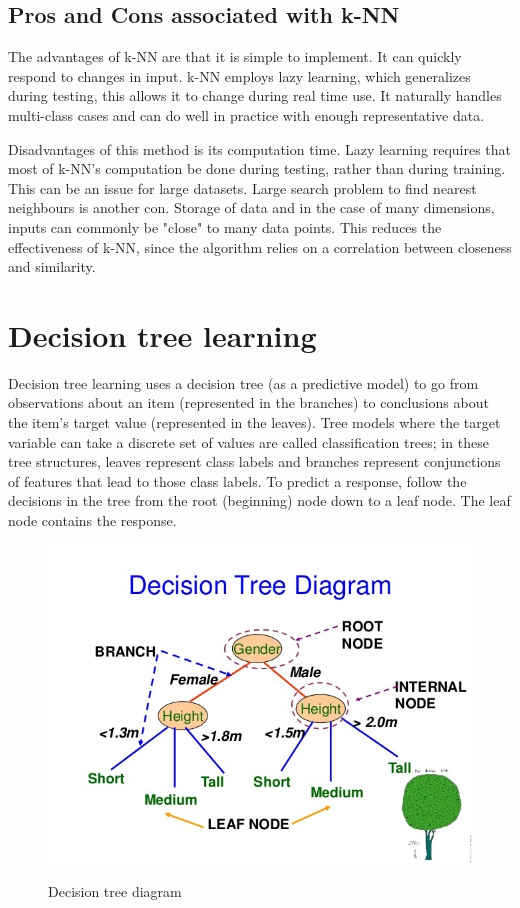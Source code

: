 \subsection{Pros and Cons associated with k-NN} \label{Pros and Cons associated with k-NN}
\noindent The advantages of k-NN are that it is simple to implement. It can quickly respond to changes in input. k-NN employs lazy learning, which generalizes during testing, this allows it to change during real time use. It naturally handles multi-class cases and can do well in practice with enough representative data. 

\noindent Disadvantages of this method is its computation time. Lazy learning requires that most of k-NN's computation be done during testing, rather than during training. This can be an issue for large datasets. Large search problem to find nearest neighbours is another con. Storage of data and in the case of many dimensions, inputs can commonly be "close" to many data points. This reduces the effectiveness of k-NN, since the algorithm relies on a correlation between closeness and similarity.

\newpage

\section{Decision tree learning} \label{Decision tree learning}

\noindent Decision tree learning uses a decision tree (as a predictive model) to go from observations about an item (represented in the branches) to conclusions about the item's target value (represented in the leaves). Tree models where the target variable can take a discrete set of values are called classification trees; in these tree structures, leaves represent class labels and branches represent conjunctions of features that lead to those class labels. To predict a response, follow the decisions in the tree from the root (beginning) node down to a leaf node. The leaf node contains the response.


\begin{figure}[H]
\centering
{\includegraphics[scale=0.75]{dt.jpg}}
\caption{Decision tree diagram}
\end{figure}

